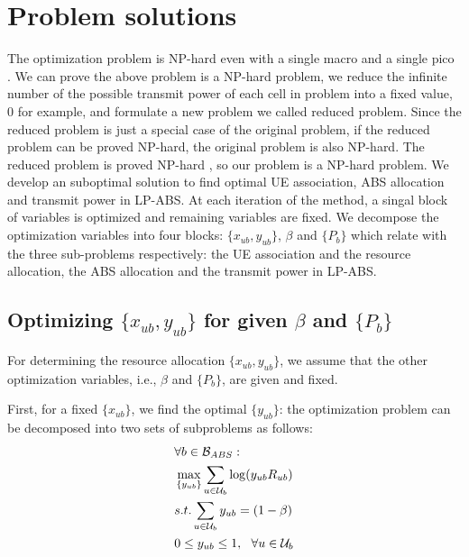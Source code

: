 \documentclass[journal]{IEEETran}
\begin{document}
\section{Problem solutions}\label{Section 3}
The optimization problem is NP-hard even with a single macro and a single pico . We can prove the above problem is a NP-hard problem, we reduce the infinite number of the possible transmit power of each cell in problem into a fixed value, $0$ for example, and formulate a new problem we called reduced problem. Since the reduced problem is just a special case of the original problem, if the reduced problem can be proved NP-hard, the original problem is also NP-hard.
The reduced problem is proved NP-hard \cite{AlgorithmEicic}, so our problem is a NP-hard problem. We develop an suboptimal solution to find optimal UE association, ABS allocation and transmit power in LP-ABS. At each iteration of the method, a singal block of variables is optimized and remaining variables are fixed. We decompose the optimization variables into four blocks: $\{x_{ub}, y_{ub}\}$, $\beta$ and $\{P_b\}$ which relate with the three sub-problems respectively: the UE association and the resource allocation, the ABS allocation and the transmit power in LP-ABS.

\subsection{Optimizing $\{ x_{ub}, y_{ub} \}$ for given $\beta$ and $\{ P_b \}$}\label{optimizing y}
For determining the resource allocation $\{x_{ub},y_{ub}\}$, we assume that the other optimization variables, i.e., $\beta$ and $\{ P_b \}$, are given and fixed. 

First, for a fixed $\{x_{ub}\}$, we find the optimal $\{y_{ub}\}$: the optimization problem can be decomposed into two sets of subproblems as follows:
\begin{align} \label{optimizing y 1}
&\forall b \in \mathcal{B}_{ABS} : \nonumber \\
& \max_{\{y_{ub}\}} \sum_{u \in \mathcal{U}_b} \log (y_{ub}R_{ub})\\
& s.t.\sum_{u \in \mathcal{U}_b} y_{ub} = (1 - \beta)\notag \\
& 0 \leq y_{ub} \leq 1,~~\forall u \in \mathcal{U}_b \notag
\end{align}
\end{document}
